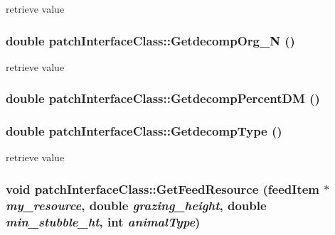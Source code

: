 retrieve value \hypertarget{classpatch_interface_class_a3a675bc14d9ac52b29a852209b591c5f}{
\subsubsection[{GetdecompOrg\_\-N}]{\setlength{\rightskip}{0pt plus 5cm}double patchInterfaceClass::GetdecompOrg\_\-N ()}}
\label{classpatch_interface_class_a3a675bc14d9ac52b29a852209b591c5f}


retrieve value \hypertarget{classpatch_interface_class_ab314c250c27ab656c14cba03ec23a642}{
\subsubsection[{GetdecompPercentDM}]{\setlength{\rightskip}{0pt plus 5cm}double patchInterfaceClass::GetdecompPercentDM ()}}
\label{classpatch_interface_class_ab314c250c27ab656c14cba03ec23a642}
\hypertarget{classpatch_interface_class_a1c3b47083e9d253938866de196e4a32f}{
\subsubsection[{GetdecompType}]{\setlength{\rightskip}{0pt plus 5cm}double patchInterfaceClass::GetdecompType ()}}
\label{classpatch_interface_class_a1c3b47083e9d253938866de196e4a32f}


retrieve value \hypertarget{classpatch_interface_class_a7fc64cbacbd920e5dceea2cb2f4d0169}{
\subsubsection[{GetFeedResource}]{\setlength{\rightskip}{0pt plus 5cm}void patchInterfaceClass::GetFeedResource ({\bf feedItem} $\ast$ {\em my\_\-resource}, \/  double {\em grazing\_\-height}, \/  double {\em min\_\-stubble\_\-ht}, \/  int {\em animalType})}}
\label{classpatch_interface_class_a7fc64cbacbd920e5dceea2cb2f4d0169}


